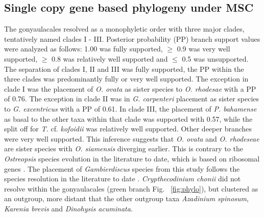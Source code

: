 \documentclass[12pt]{article}
\begin{document}
\subsection*{Single copy gene based phylogeny under MSC}
The gonyaulacales resolved as a monophyletic order with three major clades, tentatively named clades I - III. 
Posterior probability (PP) branch support values were analyzed as follows: 1.00 was fully supported, $\geq$ 0.9 was very well supported, $\geq$ 0.8 was relatively well supported and $\leq$ 0.5 was unsupported.
The separation of clades I, II and III was fully supported, the PP within the three clades was predominantly fully or very well supported. 
The exception in clade I was the placement of \emph{O. ovata} as sister species to \emph{O. rhodesae} with a PP of 0.76. 
The exception in clade II was in \emph{G. carpenteri} placement as sister species to \emph{G. excentricus} with a PP of 0.61. In clade III, the placement of \emph{P. bahamense} as basal to the other taxa within that clade was supported with 0.57, while the split off for \emph{T.} cf. \emph{kofoidii} was relatively well supported.
Other deeper branches were very well supported.
This inference suggests that \emph{O. ovata} and \emph{O. rhodeseae} are sister species with \emph{O. siamensis} diverging earlier. 
This is contrary to the \emph{Ostreopsis} species evolution in the literature to date, which is based on ribosomal genes \cite{verma2016molecular}. 
The placement of \emph{Gambierdiscus} species from this study follows the species resolution in the literature to date \cite{kretzschmar2017characterization}. 
\emph{Crypthecodinium chonii} did not resolve within the gonyaulacales (green branch Fig. ~\ref{fig:phylo}), but clustered as an outgroup, more distant that the other outgroup taxa \emph{Azadinium spinosum}, \emph{Karenia brevis} and \emph{Dinohysis acuminata}.
\FloatBarrier 
\end{document}
